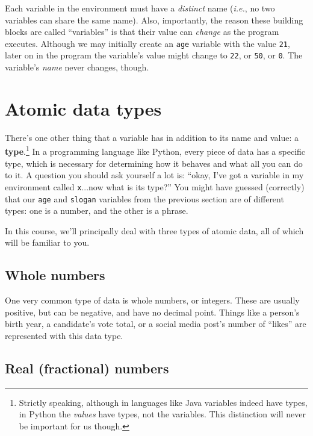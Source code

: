 Each variable in the environment must have a \textit{distinct} name
(\textit{i.e.}, no two variables can share the same name). Also, importantly,
the reason these building blocks are called ``variables'' is that their value
can \textit{change} as the program executes. Although we may initially create
an \texttt{age} variable with the value \texttt{21}, later on in the program
the variable's value might change to \texttt{22}, or \texttt{50}, or
\texttt{0}. The variable's \textit{name} never changes, though.

\section{Atomic data types}

There's one other thing that a variable has in addition to its name and value:
a \textbf{type}.\footnote{Strictly speaking, although in languages like Java
variables indeed have types, in Python the \textit{values} have types, not the
variables. This distinction will never be important for us though.}  In a
programming language like Python, every piece of data has a specific type,
which is necessary for determining how it behaves and what all you can do to
it. A question you should ask yourself a lot is: ``okay, I've got a variable in
my environment called \texttt{x}...now what is its type?'' You might have
guessed (correctly) that our \texttt{age} and \texttt{slogan} variables from
the previous section are of different types: one is a number, and the other is
a phrase.

In this course, we'll principally deal with three types of atomic data, all of
which will be familiar to you.


\subsection{Whole numbers}

One very common type of data is whole numbers, or integers. These are usually
positive, but can be negative, and have no decimal point. Things like a
person's birth year, a candidate's vote total, or a social media post's number
of ``likes'' are represented with this data type.


\subsection{Real (fractional) numbers}

